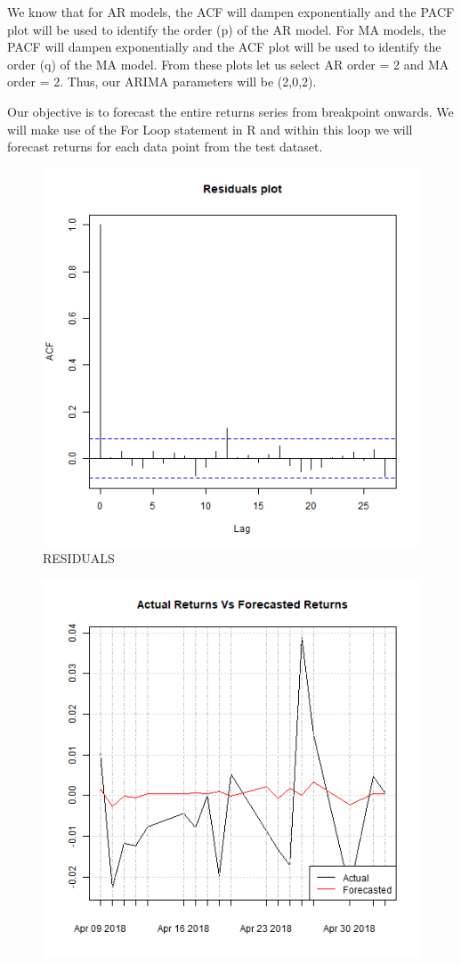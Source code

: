 \documentclass[a4paper, 12pt]{extarticle}
\begin{document}
{We know that for AR models, the ACF will dampen exponentially and the PACF plot will be used to identify the order (p) of the AR model. For MA models, the PACF will dampen exponentially and the ACF plot will be used to identify the order (q) of the MA model. From these plots let us select AR order = 2 and MA order = 2. Thus, our ARIMA parameters will be (2,0,2).

Our objective is to forecast the entire returns series from breakpoint onwards. We will make use of the For Loop statement in R and within this loop we will forecast returns for each data point from the test dataset.
\begin{figure}[H]
\centering
\includegraphics[scale=0.6]{residuals.png}
\caption{RESIDUALS}
\label{fig:residuals}
\end{figure}
\begin{figure}[H]
\centering
\includegraphics[scale=0.6]{forecast.png}

\end{figure}}
\end{document}
